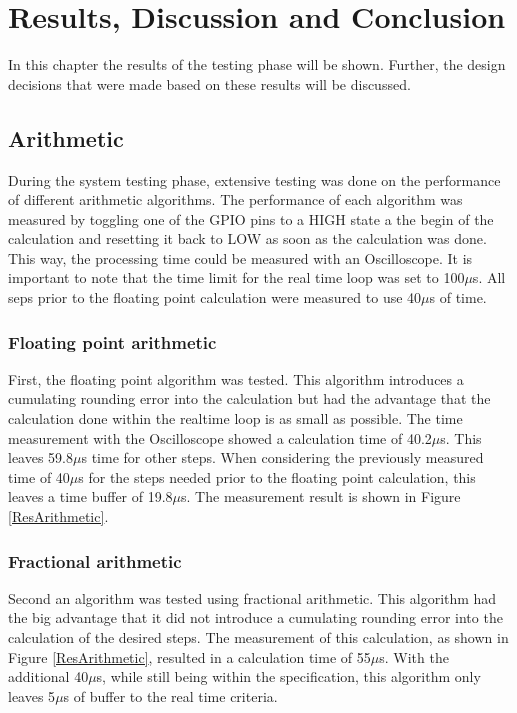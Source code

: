 \chapter{Results, Discussion and Conclusion}
\label{resultanddiscussion}
In this chapter the results of the testing phase will be shown. Further, the design decisions that were made based on these results will be discussed.

\section{Arithmetic}
During the system testing phase, extensive testing was done on the performance of different arithmetic algorithms. The performance of each algorithm was measured by toggling one of the GPIO pins to a HIGH state a the begin of the calculation and resetting it back to LOW as soon as the calculation was done. This way, the processing time could be measured with an Oscilloscope.
It is important to note that the time limit for the real time loop was set to 100$\mu$s. All seps prior to the floating point calculation were measured to use 40$\mu$s of time.

\subsection{Floating point arithmetic}
First, the floating point algorithm was tested. This algorithm introduces a cumulating rounding error into the calculation but had the advantage that the calculation done within the realtime loop is as small as possible. The time measurement with the Oscilloscope showed a calculation time of 40.2$\mu$s. This leaves 59.8$\mu$s time for other steps. When considering the previously measured time of 40$\mu$s for the steps needed prior to the floating point calculation, this leaves a time buffer of 19.8$\mu$s. The measurement result is shown in Figure \ref{ResArithmetic}.

\subsection{Fractional arithmetic}
Second an algorithm was tested using fractional arithmetic. This algorithm had the big advantage that it did not introduce a cumulating rounding error into the calculation of the desired steps. The measurement of this calculation, as shown in Figure \ref{ResArithmetic}, resulted in a calculation time of 55$\mu$s. With the additional 40$\mu$s, while still being within the specification, this algorithm only leaves 5$\mu$s of buffer to the real time criteria.

